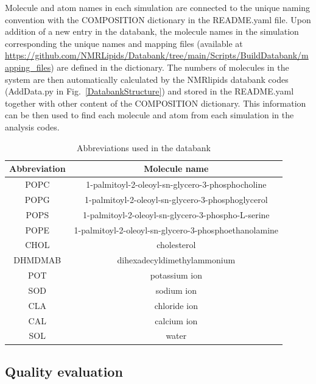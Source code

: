\documentclass[fleqn,10pt]{wlscirep}
\begin{document}
Molecule and atom names in each simulation are connected to the unique naming convention with the COMPOSITION dictionary in the README.yaml file. Upon addition of a new entry in the databank, the molecule names in the simulation corresponding the unique names and mapping files (available at \url{https://github.com/NMRLipids/Databank/tree/main/Scripts/BuildDatabank/mapping_files}) are defined in the dictionary. The numbers of molecules in the system are then automatically calculated by the NMRlipids databank codes (AddData.py in Fig.~\ref{DatabankStructure}) and stored in the README.yaml together with other content of the COMPOSITION dictionary. This information can be then used to find each molecule and atom from each simulation in the analysis codes.  

\begin{table}[h]
    \centering
    \begin{tabular}{c|c}
        Abbreviation & Molecule name \\
        \hline
        POPC &  1-palmitoyl-2-oleoyl-sn-glycero-3-phosphocholine\\
        POPG &  1-palmitoyl-2-oleoyl-sn-glycero-3-phosphoglycerol \\
        POPS & 1-palmitoyl-2-oleoyl-sn-glycero-3-phospho-L-serine \\
        POPE & 1-palmitoyl-2-oleoyl-sn-glycero-3-phosphoethanolamine \\
        CHOL & cholesterol \\
        DHMDMAB & dihexadecyldimethylammonium \\
        \hline
        POT & potassium ion \\
        SOD & sodium ion \\
        CLA & chloride ion \\
        CAL & calcium ion \\
        SOL & water \\
    \end{tabular}
    \caption{Abbreviations used in the databank}
    \label{tab:abbreviations}
\end{table}


\subsection{Quality evaluation}
\end{document}
